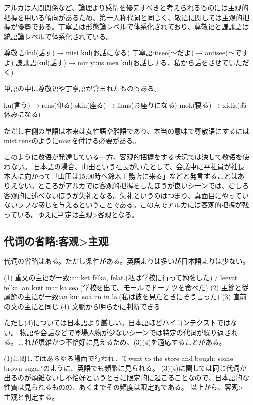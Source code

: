 アルカは人間関係など、論理より感情を優先すべきと考えられるものには主观的把握を用いる傾向があるため、第一人称代词と同じく、敬语に関しては主观的把握が優勢である。丁寧語は形態論レベルで体系化されており、尊敬语と謙譲語は統語論レベルで体系化されている。

尊敬语:kul(話す) → mist kul(お話になる)
丁寧語:tisee(～だよ) → antisee(～ですよ)
謙譲語:kul(話す) → mir yuus men kul(お話しする、私から話をさせていただく)

単語の中に尊敬语や丁寧語が含まれたものもある。

ku(言う) → rens(仰る)
skin(座る) → fians(お座りになる)
mok(寝る) → xidia(お休みになる)

ただし右側の単語は本来は女性語や雅語であり、本当の意味で尊敬语にするにはmist rensのようにmistを付ける必要がある。

このように敬语が発達している一方、客观的把握をする状況では決して敬语を使わない。
日本語の場合、山田という社長がいたとして、会議中に平社員が社長本人に向かって「山田は15:00時へ鈴木工務店に来る」などと発言することはありえない。ところがアルカでは客观的把握をしたほうが良いシーンでは、むしろ客观的に述べないほうが失礼となる。失礼というのはつまり、真面目にやっていないラフな感じを与えるということである。この点でアルカには客观的把握が残っている。ゆえに判定は主观>客观となる。

\subsection{代词の省略:客观>主观}

代词の省略はある。ただし条件がある。英語よりは多いが日本語よりは少ない。

(1) 重文の主语が一致:an ket felka, felat.(私は学校に行って勉強した) / leevat felka, an kuit mar ka sea.(学校を出て、モールでドーナツを食べた)
(2) 主節と従属節の主语が一致:an kut soa im in la.(私は彼を見たときにそう言った)
(3) 直前の文の主语と同じ
(4) 文脈から明らかに判断できる

ただし(4)については日本語より厳しい。日本語ほどハイコンテクストではない。
物語や会話などで登場人物が少ないシーンでは特定の代词が繰り返される。これが煩雑かつ不恰好に見えるため、(3)(4)を適応することがある。

(1)に関してはあらゆる場面で行われ、"I went to the store and bought some brown sugar"のように、英語でも頻繁に見られる。
(3)(4)に関しては同じ代词が出るのが煩雑ないし不恰好というときに限定的に起こることなので、日本語的な性質は見られるものの、あくまでその頻度は限定的である。
以上から、客观>主观と判定する。

